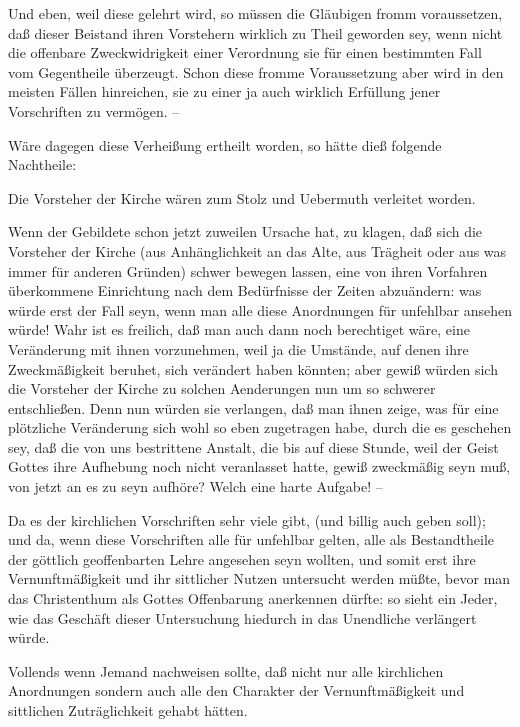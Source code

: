\begin{aufza}
\begin{aufzb}
\begin{aufzc}
\item Und eben, weil diese gelehrt wird, so müssen die Gläubigen fromm voraussetzen, daß dieser Beistand ihren Vorstehern wirklich zu Theil geworden sey, wenn nicht die offenbare Zweckwidrigkeit einer Verordnung sie für einen bestimmten Fall vom Gegentheile überzeugt. Schon diese fromme Voraussetzung aber wird in den meisten Fällen hinreichen, sie zu einer  ja auch wirklich  Erfüllung jener Vorschriften zu vermögen. --
\end{aufzc}
Wäre dagegen diese Verheißung  ertheilt worden, so hätte dieß folgende Nachtheile:~
\begin{aufzc}
\item Die Vorsteher der Kirche wären zum Stolz und Uebermuth verleitet worden.
\item Wenn der Gebildete schon jetzt zuweilen Ursache hat, zu klagen, daß sich die Vorsteher der Kirche (aus Anhänglichkeit an das Alte, aus Trägheit oder aus was immer für anderen Gründen) schwer bewegen lassen, eine von ihren Vorfahren überkommene Einrichtung nach dem Bedürfnisse der Zeiten abzuändern: was würde erst der Fall seyn, wenn man alle diese Anordnungen für unfehlbar ansehen würde! Wahr ist es freilich, daß man auch dann noch berechtiget wäre, eine Veränderung mit ihnen vorzunehmen, weil ja die Umstände, auf denen ihre Zweckmäßigkeit beruhet, sich verändert haben könnten; aber gewiß würden sich die Vorsteher der Kirche zu solchen Aenderungen nun um so schwerer entschließen. Denn nun würden sie verlangen, daß man ihnen zeige, was für eine plötzliche Veränderung sich wohl so eben zugetragen habe, durch die es geschehen sey, daß die von uns bestrittene Anstalt, die bis auf diese Stunde, weil der Geist Gottes ihre Aufhebung noch nicht veranlasset hatte, gewiß zweckmäßig seyn muß, von jetzt an es zu seyn aufhöre? Welch eine harte Aufgabe! --
\item Da es der kirchlichen Vorschriften sehr viele gibt, (und billig auch geben soll); und da, wenn diese Vorschriften alle für unfehlbar gelten, alle als Bestandtheile der göttlich geoffenbarten Lehre angesehen seyn wollten, und somit erst ihre Vernunftmäßigkeit und ihr sittlicher Nutzen untersucht werden müßte, bevor man das Christenthum als Gottes Offenbarung anerkennen dürfte: so sieht ein Jeder, wie das Geschäft dieser Untersuchung hiedurch in das Unendliche verlängert würde.
\item Vollends wenn Jemand nachweisen sollte, daß nicht nur alle  kirchlichen Anordnungen  sondern auch alle  den Charakter der Vernunftmäßigkeit und sittlichen Zuträglichkeit gehabt hätten.~

\end{aufzc}
\end{aufzb}
\end{aufza}
